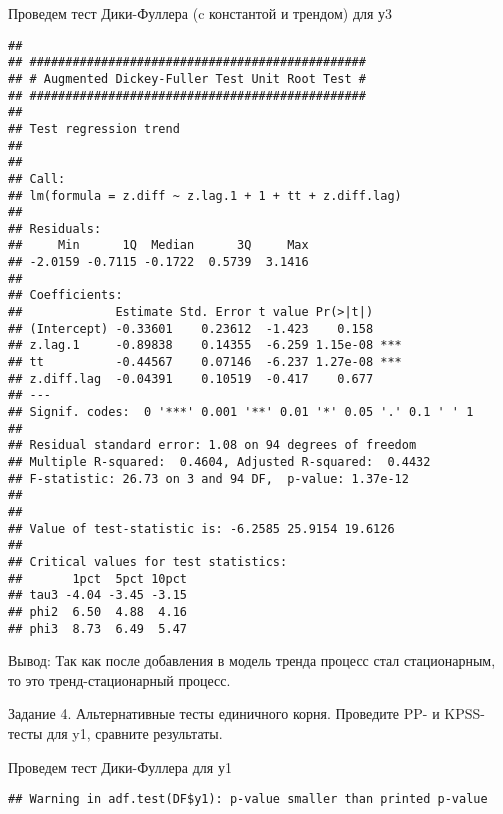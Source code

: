 \documentclass[
]{article}
\newenvironment{Shaded}{\begin{snugshade}}{\end{snugshade}}
\newcommand{\AttributeTok}[1]{\textcolor[rgb]{0.13,0.29,0.53}{#1}}
\newcommand{\FunctionTok}[1]{\textcolor[rgb]{0.13,0.29,0.53}{\textbf{#1}}}
\newcommand{\NormalTok}[1]{#1}
\newcommand{\SpecialCharTok}[1]{\textcolor[rgb]{0.81,0.36,0.00}{\textbf{#1}}}
\newcommand{\StringTok}[1]{\textcolor[rgb]{0.31,0.60,0.02}{#1}}
\begin{document}
Проведем тест Дики-Фуллера (c константой и трендом) для у3

\begin{Shaded}
\end{Shaded}

\begin{verbatim}
## 
## ############################################### 
## # Augmented Dickey-Fuller Test Unit Root Test # 
## ############################################### 
## 
## Test regression trend 
## 
## 
## Call:
## lm(formula = z.diff ~ z.lag.1 + 1 + tt + z.diff.lag)
## 
## Residuals:
##     Min      1Q  Median      3Q     Max 
## -2.0159 -0.7115 -0.1722  0.5739  3.1416 
## 
## Coefficients:
##             Estimate Std. Error t value Pr(>|t|)    
## (Intercept) -0.33601    0.23612  -1.423    0.158    
## z.lag.1     -0.89838    0.14355  -6.259 1.15e-08 ***
## tt          -0.44567    0.07146  -6.237 1.27e-08 ***
## z.diff.lag  -0.04391    0.10519  -0.417    0.677    
## ---
## Signif. codes:  0 '***' 0.001 '**' 0.01 '*' 0.05 '.' 0.1 ' ' 1
## 
## Residual standard error: 1.08 on 94 degrees of freedom
## Multiple R-squared:  0.4604, Adjusted R-squared:  0.4432 
## F-statistic: 26.73 on 3 and 94 DF,  p-value: 1.37e-12
## 
## 
## Value of test-statistic is: -6.2585 25.9154 19.6126 
## 
## Critical values for test statistics: 
##       1pct  5pct 10pct
## tau3 -4.04 -3.45 -3.15
## phi2  6.50  4.88  4.16
## phi3  8.73  6.49  5.47
\end{verbatim}

Вывод: Так как после добавления в модель тренда процесс стал
стационарным, то это тренд-стационарный процесс.

Задание 4. Альтернативные тесты единичного корня. Проведите PP- и
KPSS-тесты для y1, сравните результаты.

Проведем тест Дики-Фуллера для у1

\begin{Shaded}
\end{Shaded}

\begin{verbatim}
## Warning in adf.test(DF$y1): p-value smaller than printed p-value
\end{verbatim}
\end{document}
